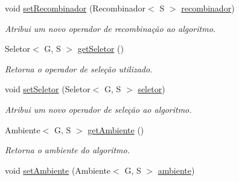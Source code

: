 \begin{DoxyCompactItemize}
void \hyperlink{classic_1_1populacional_1_1algoritmo_1_1_algoritmo_evolucionario_3_01_gextends_01_number_01_6_co1efdb05fe19a950b8d1e9e15f7d06254_ae2ec6e66337c0c1075767f9222ecaa20}{set\-Recombinador} (Recombinador$<$ S $>$ \hyperlink{classic_1_1populacional_1_1algoritmo_1_1_algoritmo_evolucionario_3_01_gextends_01_number_01_6_co1efdb05fe19a950b8d1e9e15f7d06254_a5ca76dcf5ea537ba8af6e1b66559de43}{recombinador})
\begin{DoxyCompactList}\small\item\em Atribui um novo operador de recombinação ao algoritmo. \end{DoxyCompactList}\item 
Seletor$<$ G, S $>$ \hyperlink{classic_1_1populacional_1_1algoritmo_1_1_algoritmo_evolucionario_3_01_gextends_01_number_01_6_co1efdb05fe19a950b8d1e9e15f7d06254_abf133c60cd2d87d98243c232df8a57f9}{get\-Seletor} ()
\begin{DoxyCompactList}\small\item\em Retorna o operador de seleção utilizado. \end{DoxyCompactList}\item 
void \hyperlink{classic_1_1populacional_1_1algoritmo_1_1_algoritmo_evolucionario_3_01_gextends_01_number_01_6_co1efdb05fe19a950b8d1e9e15f7d06254_a359a39d12caae7697213b535e4c60b74}{set\-Seletor} (Seletor$<$ G, S $>$ \hyperlink{classic_1_1populacional_1_1algoritmo_1_1_algoritmo_evolucionario_3_01_gextends_01_number_01_6_co1efdb05fe19a950b8d1e9e15f7d06254_ab55978264aecc3e7faa54575dcb3c95b}{seletor})
\begin{DoxyCompactList}\small\item\em Atribui um novo operador de seleção ao algoritmo. \end{DoxyCompactList}\item 
Ambiente$<$ G, S $>$ \hyperlink{classic_1_1populacional_1_1algoritmo_1_1_algoritmo_evolucionario_3_01_gextends_01_number_01_6_co1efdb05fe19a950b8d1e9e15f7d06254_a998385f45e2ac36c869623a549e26898}{get\-Ambiente} ()
\begin{DoxyCompactList}\small\item\em Retorna o ambiente do algoritmo. \end{DoxyCompactList}\item 
void \hyperlink{classic_1_1populacional_1_1algoritmo_1_1_algoritmo_evolucionario_3_01_gextends_01_number_01_6_co1efdb05fe19a950b8d1e9e15f7d06254_a68db18fec4322f9ec81e1b958162b655}{set\-Ambiente} (Ambiente$<$ G, S $>$ \hyperlink{classic_1_1populacional_1_1algoritmo_1_1_algoritmo_evolucionario_3_01_gextends_01_number_01_6_co1efdb05fe19a950b8d1e9e15f7d06254_a7ccec051269f59db009703ae09400f54}{ambiente})

\end{DoxyCompactItemize}
